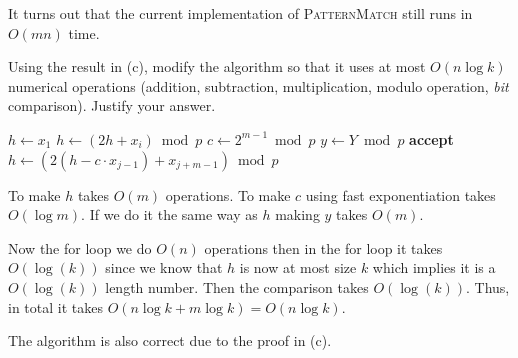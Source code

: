 \documentclass[12pt, letterpaper]{article}
\begin{document}
\begin{subproblem}{}
    It turns out that the current implementation of \textsc{PatternMatch} still runs in $O(mn)$ time. 

        Using the result in (c), modify the algorithm so that it uses at most $O(n \log k)$ numerical operations (addition, subtraction, multiplication, modulo operation, \emph{bit} comparison). Justify your answer.
\end{subproblem}
\begin{problemproof}
    \begin{minipage}{\linewidth}
        \begin{algorithm}[H]
          \begin{algorithmic}[1]
                \State $h \gets x_1$
                    \State $h \gets (2h + x_i)\bmod p$
                \EndFor
                \State $c \gets 2^{m-1} \bmod p$
                \State $y \gets Y \bmod p$ 
                \textbf{ accept}\EndIf
                    \State $h \gets (2(h - c \cdot x_{j-1}) + x_{j+m-1}) \bmod p$
                    \EndIf
                \EndFor
            \EndFunction
          \end{algorithmic}
        \end{algorithm}
      \end{minipage}

      To make $h$ takes $O(m)$ operations. To make $c$ using fast exponentiation takes $O(\log m)$. If we do it the same way as $h$ making $y$ takes $O(m)$.

      Now the for loop we do $O(n)$ operations then in the for loop it takes $O(\log(k))$ since we know that $h$ is now at most size $k$ which implies it is a $O(\log(k))$ length number. Then the comparison takes $O(\log(k))$. Thus, in total it takes $O(n\log k+m\log k)=O(n \log k)$.

      The algorithm is also correct due to the proof in (c).
\end{problemproof}
\end{document}
